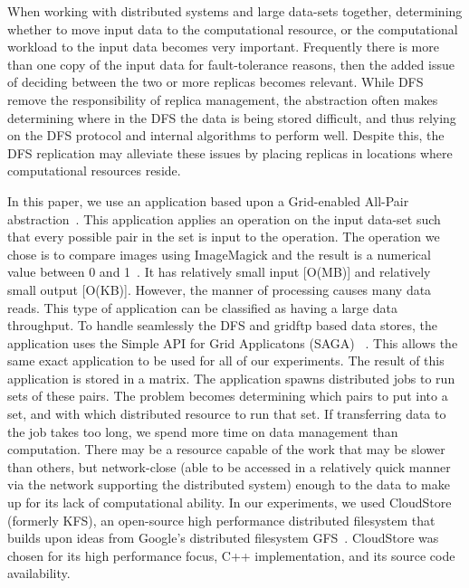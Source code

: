 \documentclass[a4paper,11pt]{article}
\newcommand{\jhanote}[1]{ {\textcolor{red} { ***Jha: #1 }}}
\newcommand{\jhanote}[1]{}
\begin{document}
When working with distributed systems and large data-sets together, determining whether to move input data to the computational resource, or the computational workload to the input data becomes very important. Frequently there is more than one copy of the input data for fault-tolerance reasons, then the added issue of deciding between the two or more replicas becomes relevant. While DFS remove the responsibility of replica management, the abstraction often makes determining where in the DFS the data is being stored difficult, and thus relying on the DFS protocol and internal algorithms to perform well. Despite this, the DFS replication may alleviate these issues by placing replicas in locations where computational resources reside.


In this paper, we use an application based upon a Grid-enabled All-Pair abstraction~\cite{Interop, AllPairs}. This application applies an operation on the input data-set such that every possible pair in the set is input to the operation. The operation we chose is to compare images using ImageMagick and the result is a numerical value between 0 and 1~\cite{imagemagick}. It has relatively small input [O(MB)] and relatively small output [O(KB)]. However, the manner of processing causes many data reads. This type of application can be classified as having a large data throughput. To handle seamlessly the DFS and gridftp based data stores, the application uses the Simple API for Grid Applicatons (SAGA) ~\cite{saga_web}. This allows the same exact application to be used for all of our experiments. The result of this application is stored in a matrix. The application spawns distributed jobs to run sets of these pairs. The problem becomes determining which pairs to put into a set, and with which distributed resource to run that set. If transferring data to the job takes too long, we spend more time on data management than computation. There may be a resource capable of the work that may be slower than others, but network-close (able to be accessed in a relatively quick manner via the network supporting the distributed system) enough to the data to make up for its lack of computational ability. In our experiments, we used CloudStore (formerly KFS), an open-source high performance distributed filesystem that builds upon ideas from Google's distributed filesystem GFS~\cite{kfs_web}. CloudStore was chosen for its high performance focus, C++ implementation, and its source code availability.
\end{document}
